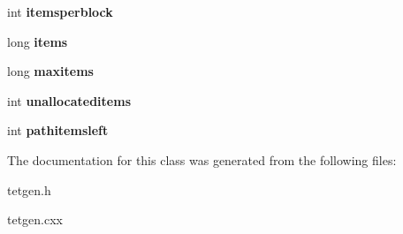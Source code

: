 \begin{DoxyCompactItemize}
$$int {\bfseries itemsperblock}
\item 
\mbox{\label{classtetgenmesh_1_1memorypool_af29a38b2654a8d977dd24eea8dc72729}} 
long {\bfseries items}
\item 
\mbox{\label{classtetgenmesh_1_1memorypool_ae9dda5bafe91eed206b26fa7d7020716}} 
long {\bfseries maxitems}
\item 
\mbox{\label{classtetgenmesh_1_1memorypool_aa8a5667ab1f55ec7ef852d378871b9ee}} 
int {\bfseries unallocateditems}
\item 
\mbox{\label{classtetgenmesh_1_1memorypool_ad83a51d49f6e03ff38151b870a2f51dd}} 
int {\bfseries pathitemsleft}
\end{DoxyCompactItemize}


The documentation for this class was generated from the following files\+:\begin{DoxyCompactItemize}
\item 
tetgen.\+h\item 
tetgen.\+cxx\end{DoxyCompactItemize}
